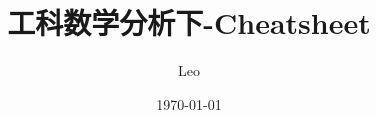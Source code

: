 \usepackage[margin=2.5cm]{geometry}

\usepackage{fancyhdr} %
\pagestyle{fancy} %
\fancyhf{} %
\fancyfoot[C]{\thepage} 

\usepackage{draftwatermark}
\usepackage{xcolor}
\SetWatermarkFontSize{1cm} %

\usepackage{amsmath}%
\usepackage{hyperref}
\usepackage{bm}
\usepackage{amssymb}
\usepackage{esint}
\usepackage{amsthm}
\title{\Huge 工科数学分析下-Cheatsheet}
\author{Leo}
\date{\today}

\newcommand\myeqref[1]{式\eqref{#1}}
\newcommand{\drho}{\dif \rho}
\newcommand{\dsig}{\dif \sigma}
\newcommand{\dthe}{\dif \theta}
\newcommand\dif{\mathrm{d}}

\newcommand{\noindentbf}[1]{\noindent \textbf{#1} \quad}

\theoremstyle{plain}
\newtheorem{theorem}{定理与结论}[section]
\theoremstyle{definition}
\newtheorem{definition}[theorem]{定义与概念}
\theoremstyle{remark}
\newtheorem*{remark}{注}
\theoremstyle{plain}
\newtheorem*{application}{应用}